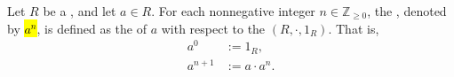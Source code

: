 \begin{definition} \label{definition:exponentiation_in_a_semiring}
    Let $R$ be a , and let $a \in R$. For each nonnegative integer $n \in \mathbb{Z}_{\geq 0}$, the , denoted by \hl{$a^n$}, is defined as the  of $a$ with respect to the  $(R, \cdot, 1_R)$. That is,
    \begin{align*}
        a^0 &:= 1_R, \\
        a^{n+1} &:= a \cdot a^n.
    \end{align*}
\end{definition}
